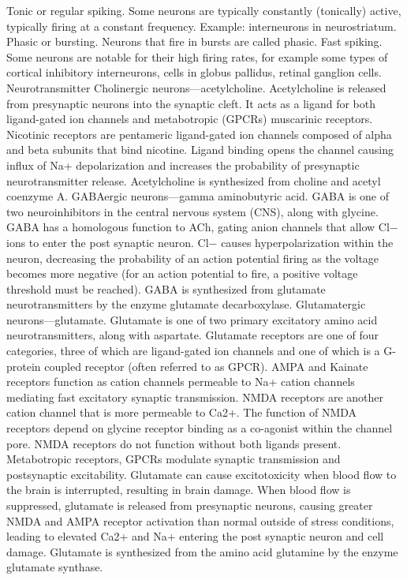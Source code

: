 \documentclass[]{book}
\begin{document}
Tonic or regular spiking. Some neurons are typically constantly (tonically) active, typically firing at a constant frequency. Example: interneurons in neurostriatum.
Phasic or bursting. Neurons that fire in bursts are called phasic.
Fast spiking. Some neurons are notable for their high firing rates, for example some types of cortical inhibitory interneurons, cells in globus pallidus, retinal ganglion cells.
Neurotransmitter
Cholinergic neurons---acetylcholine. Acetylcholine is released from presynaptic neurons into the synaptic cleft. It acts as a ligand for both ligand-gated ion channels and metabotropic (GPCRs) muscarinic receptors. Nicotinic receptors are pentameric ligand-gated ion channels composed of alpha and beta subunits that bind nicotine. Ligand binding opens the channel causing influx of Na+ depolarization and increases the probability of presynaptic neurotransmitter release. Acetylcholine is synthesized from choline and acetyl coenzyme A.
GABAergic neurons---gamma aminobutyric acid. GABA is one of two neuroinhibitors in the central nervous system (CNS), along with glycine. GABA has a homologous function to ACh, gating anion channels that allow Cl− ions to enter the post synaptic neuron. Cl− causes hyperpolarization within the neuron, decreasing the probability of an action potential firing as the voltage becomes more negative (for an action potential to fire, a positive voltage threshold must be reached). GABA is synthesized from glutamate neurotransmitters by the enzyme glutamate decarboxylase.
Glutamatergic neurons---glutamate. Glutamate is one of two primary excitatory amino acid neurotransmitters, along with aspartate. Glutamate receptors are one of four categories, three of which are ligand-gated ion channels and one of which is a G-protein coupled receptor (often referred to as GPCR).
AMPA and Kainate receptors function as cation channels permeable to Na+ cation channels mediating fast excitatory synaptic transmission.
NMDA receptors are another cation channel that is more permeable to Ca2+. The function of NMDA receptors depend on glycine receptor binding as a co-agonist within the channel pore. NMDA receptors do not function without both ligands present.
Metabotropic receptors, GPCRs modulate synaptic transmission and postsynaptic excitability.
Glutamate can cause excitotoxicity when blood flow to the brain is interrupted, resulting in brain damage. When blood flow is suppressed, glutamate is released from presynaptic neurons, causing greater NMDA and AMPA receptor activation than normal outside of stress conditions, leading to elevated Ca2+ and Na+ entering the post synaptic neuron and cell damage. Glutamate is synthesized from the amino acid glutamine by the enzyme glutamate synthase.
\end{document}
